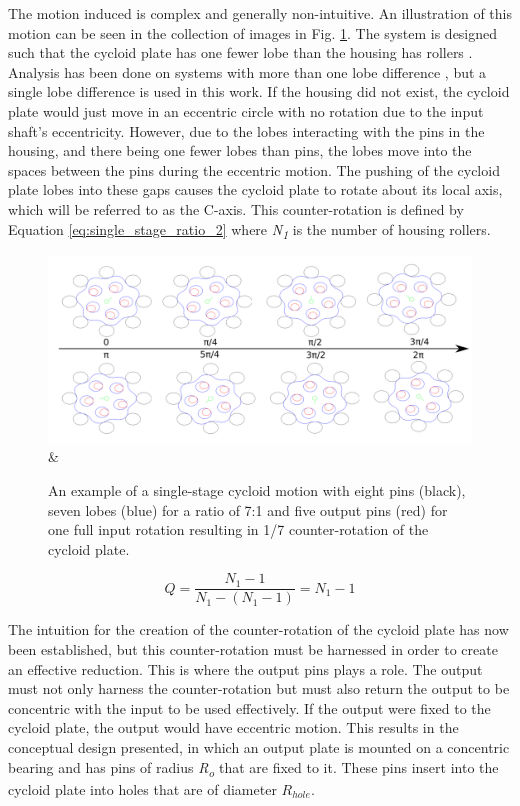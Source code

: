 The motion induced is complex and generally non-intuitive. An illustration of this motion can be seen in the collection of images in Fig. \ref{fig:single_motion}. The system is designed such that the cycloid plate has one fewer lobe than the housing has rollers \cite{ref:pollitt}. Analysis has been done on systems with more than one lobe difference \cite{ref:hsieh_traditional}, but a single lobe difference is used in this work. If the housing did not exist, the cycloid plate would just move in an eccentric circle with no rotation due to the input shaft's eccentricity. However, due to the lobes interacting with the pins in the housing, and there being one fewer lobes than pins, the lobes move into the spaces between the pins during the eccentric motion. The pushing of the cycloid plate lobes into these gaps causes the cycloid plate to rotate about its local axis, which will be referred to as the C-axis. This counter-rotation is defined by Equation \ref{eq:single_stage_ratio_2} \cite{ref:on_the_lobe} where \textit{N\textsubscript{1}} is the number of housing rollers.

\begin{figure}[t]
   \centering
   \includegraphics[width=1.0\linewidth]{fig/single_motion} &
   \caption{An example of a single-stage cycloid motion with eight pins (black), seven lobes (blue) for a ratio of 7:1 and five output pins (red) for one full input rotation resulting in 1/7 counter-rotation of the cycloid plate.}
   \label{fig:single_motion}
\end{figure}


\begin{equation} \label{eq:single_stage_ratio_2}
Q = \frac{N_1-1} {N_1 - (N_1 - 1)} = N_1 -1
\end{equation}

The intuition for the creation of the counter-rotation of the cycloid plate has now been established, but this counter-rotation must be harnessed in order to create an effective reduction. This is where the output pins plays a role. The output must not only harness the counter-rotation but must also return the output to be concentric with the input to be used effectively. If the output were fixed to the cycloid plate, the output would have eccentric motion. This results in the conceptual design presented, in which an output plate is mounted on a concentric bearing and has pins of radius \textit{R\textsubscript{o}} that are fixed to it. These pins insert into the cycloid plate into holes that are of diameter $R_{hole}$.

